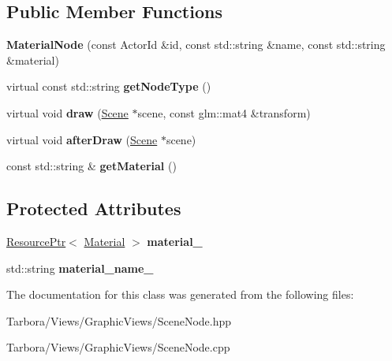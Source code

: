 \subsection*{Public Member Functions}
\begin{DoxyCompactItemize}
\item 
\mbox{\label{classTarbora_1_1MaterialNode_a1e1fa10626850624e034d6ff2998ae25}} 
{\bfseries Material\+Node} (const Actor\+Id \&id, const std\+::string \&name, const std\+::string \&material)
\item 
\mbox{\label{classTarbora_1_1MaterialNode_a2fdff51603afd7a8f143b43f6ac44a83}} 
virtual const std\+::string {\bfseries get\+Node\+Type} ()
\item 
\mbox{\label{classTarbora_1_1MaterialNode_abb529ca3cba4c4701d2408cfd951a0bd}} 
virtual void {\bfseries draw} (\hyperlink{classTarbora_1_1Scene}{Scene} $\ast$scene, const glm\+::mat4 \&transform)
\item 
\mbox{\label{classTarbora_1_1MaterialNode_a18f420780044fc1b8ccbc88831713590}} 
virtual void {\bfseries after\+Draw} (\hyperlink{classTarbora_1_1Scene}{Scene} $\ast$scene)
\item 
\mbox{\label{classTarbora_1_1MaterialNode_abd98982aff234982d98687d5e95a2de4}} 
const std\+::string \& {\bfseries get\+Material} ()
\end{DoxyCompactItemize}
\subsection*{Protected Attributes}
\begin{DoxyCompactItemize}
\item 
\mbox{\label{classTarbora_1_1MaterialNode_aea611cfa751354cba50f9ed434d138db}} 
\hyperlink{classTarbora_1_1ResourcePtr}{Resource\+Ptr}$<$ \hyperlink{classTarbora_1_1Material}{Material} $>$ {\bfseries material\+\_\+}
\item 
\mbox{\label{classTarbora_1_1MaterialNode_a02a5eee099049757bbcd9fdd3fc139c9}} 
std\+::string {\bfseries material\+\_\+name\+\_\+}
\end{DoxyCompactItemize}


The documentation for this class was generated from the following files\+:\begin{DoxyCompactItemize}
\item 
Tarbora/\+Views/\+Graphic\+Views/Scene\+Node.\+hpp\item 
Tarbora/\+Views/\+Graphic\+Views/Scene\+Node.\+cpp\end{DoxyCompactItemize}
